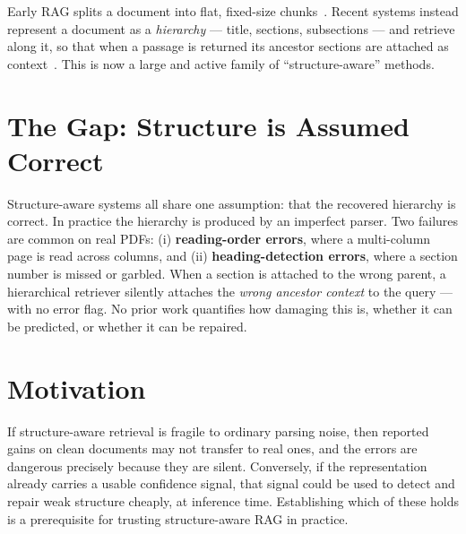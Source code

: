 \documentclass[12pt,a4paper]{report}
\begin{document}
Early RAG splits a document into flat, fixed-size chunks~\cite{borgeaud2022retro,izacard2023atlas}.
Recent systems instead represent a document as a \emph{hierarchy} --- title, sections, subsections
--- and retrieve along it, so that when a passage is returned its ancestor sections are attached as
context~\cite{sarthi2024raptor,tao2025treerag,lu2026hichunk}. This is now a large and active family
of ``structure-aware'' methods.

\section{The Gap: Structure is Assumed Correct}
Structure-aware systems all share one assumption: that the recovered hierarchy is correct. In
practice the hierarchy is produced by an imperfect parser. Two failures are common on real PDFs:
(i) \textbf{reading-order errors}, where a multi-column page is read across columns, and (ii)
\textbf{heading-detection errors}, where a section number is missed or garbled. When a section is
attached to the wrong parent, a hierarchical retriever silently attaches the \emph{wrong ancestor
context} to the query --- with no error flag. No prior work quantifies how damaging this is, whether
it can be predicted, or whether it can be repaired.

\section{Motivation}
If structure-aware retrieval is fragile to ordinary parsing noise, then reported gains on clean
documents may not transfer to real ones, and the errors are dangerous precisely because they are
silent. Conversely, if the representation already carries a usable confidence signal, that signal
could be used to detect and repair weak structure cheaply, at inference time. Establishing which of
these holds is a prerequisite for trusting structure-aware RAG in practice.
\end{document}
